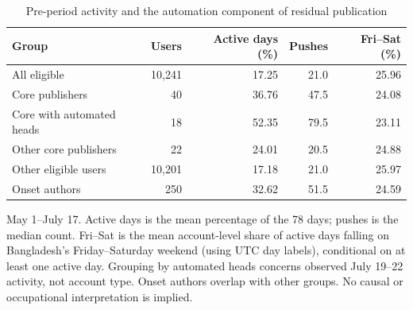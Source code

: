 \begin{table}[htbp]
\centering\small
\caption{Pre-period activity and the automation component of residual publication}
\label{tab:evidence_features}
\begin{threeparttable}
\begin{tabular}{@{}p{}rrrr@{}}
\toprule
Group & Users & Active days (\%) & Pushes & Fri--Sat (\%) \\
\midrule
All eligible & 10,241 & 17.25 & 21.0 & 25.96 \\
Core publishers & 40 & 36.76 & 47.5 & 24.08 \\
Core with automated heads & 18 & 52.35 & 79.5 & 23.11 \\
Other core publishers & 22 & 24.01 & 20.5 & 24.88 \\
Other eligible users & 10,201 & 17.18 & 21.0 & 25.97 \\
Onset authors & 250 & 32.62 & 51.5 & 24.59 \\
\bottomrule\end{tabular}
\begin{tablenotes}[flushleft]\footnotesize
\item May 1--July 17. Active days is the mean percentage of the 78 days; pushes is the median count. Fri--Sat is the mean account-level share of active days falling on Bangladesh's Friday--Saturday weekend (using UTC day labels), conditional on at least one active day. Grouping by automated heads concerns observed July 19--22 activity, not account type. Onset authors overlap with other groups. No causal or occupational interpretation is implied.
\end{tablenotes}\end{threeparttable}\end{table}
